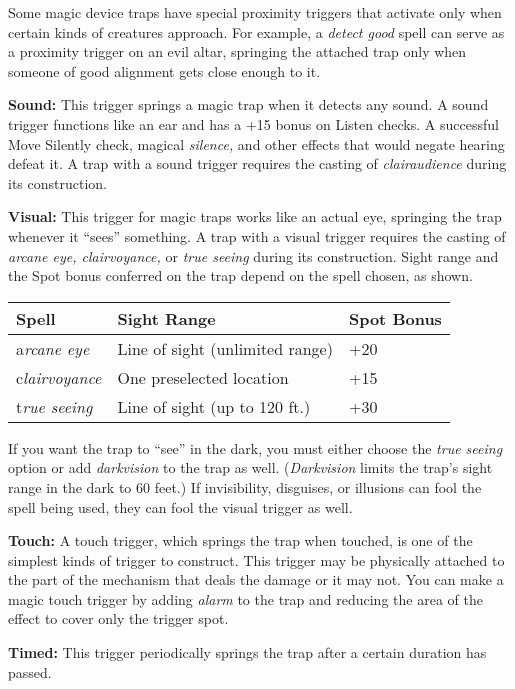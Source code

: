 \documentclass{article}
\begin{document}
Some magic device traps have special proximity triggers that activate only when 
certain kinds of creatures approach. For example, a \textit{detect good }spell 
can serve as a proximity trigger on an evil altar, springing the attached trap 
only when someone of good alignment gets close enough to it.

\textbf{Sound:} This trigger springs a magic trap when it detects any sound. A 
sound trigger functions like an ear and has a +15 bonus on Listen checks. A successful 
Move Silently check, magical \textit{silence, }and other effects that would negate 
hearing defeat it. A trap with a sound trigger requires the casting of \textit{clairaudience 
}during its construction.

\textbf{Visual:} This trigger for magic traps works like an actual eye, springing 
the trap whenever it ``sees'' something. A trap with a visual trigger requires 
the casting of \textit{arcane eye, clairvoyance, }or \textit{true seeing }during 
its construction. Sight range and the Spot bonus conferred on the trap depend on 
the spell chosen, as shown.

\begin{tabular}{|>{\raggedright}p{50pt}|>{\raggedright}p{122pt}|>{\raggedright}p{47pt}|}
\hline
S\textbf{pell} & S\textbf{ight Range} & S\textbf{pot Bonus}\tabularnewline
\hline
a\textit{rcane eye} & Line of sight (unlimited range) & +20\tabularnewline
\hline
c\textit{lairvoyance} & One preselected location & +15\tabularnewline
\hline
t\textit{rue seeing} & Line of sight (up to 120 ft.) & +30\tabularnewline
\hline
\end{tabular}

If you want the trap to ``see'' in the dark, you must either choose the \textit{true 
seeing }option or add \textit{darkvision }to the trap as well. (\textit{Darkvision 
}limits the trap's sight range in the dark to 60 feet.) If invisibility, disguises, 
or illusions can fool the spell being used, they can fool the visual trigger as 
well. 

\textbf{Touch: }A touch trigger, which springs the trap when touched, is one of 
the simplest kinds of trigger to construct. This trigger may be physically attached 
to the part of the mechanism that deals the damage or it may not. You can make 
a magic touch trigger by adding \textit{alarm }to the trap and reducing the area 
of the effect to cover only the trigger spot.

\textbf{Timed:} This trigger periodically springs the trap after a certain duration 
has passed.
\end{document}
